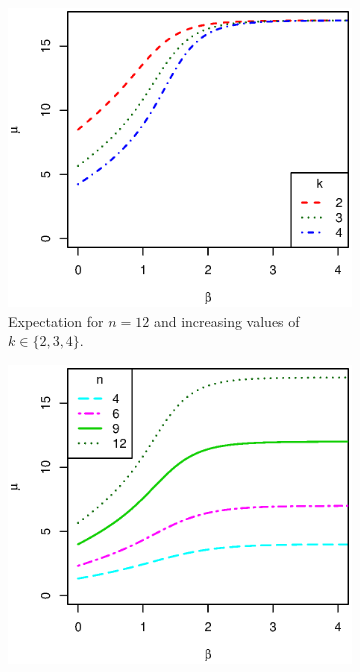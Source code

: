 \documentclass[nojss,shortnames]{jss}\usepackage[]{graphicx}\usepackage[]{color}
\begin{document}
\begin{figure}
\centering
        \begin{subfigure}{0.45\textwidth}
                \includegraphics[width=\textwidth]{exact_exp_k.eps}
                \caption{Expectation for $n=12$ and increasing values of $k \in \{2, 3, 4\}$.}
                \label{f:exact_exp_k}
        \end{subfigure}
\qquad
        \begin{subfigure}{0.45\textwidth}
                \includegraphics[width=\textwidth]{exact_exp_n.eps}

\end{subfigure}
\end{figure}
\end{document}
